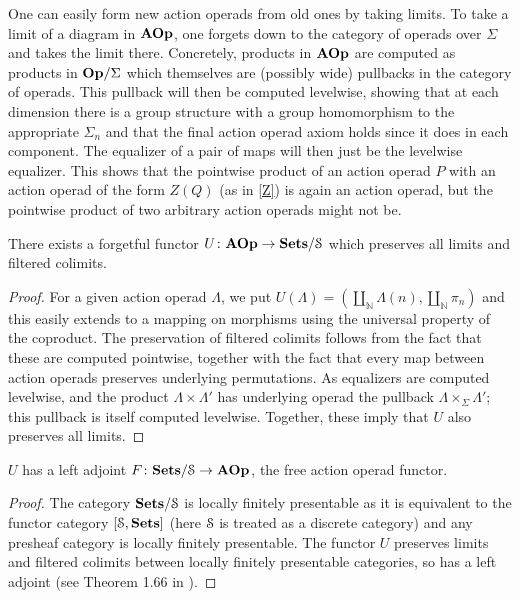 \begin{example}
One can easily form new action operads from old ones by taking limits. To take a limit of a diagram in $\mathbf{AOp}$, one forgets down to the category of operads over $\Sigma$ and takes the limit there. Concretely, products in $\mathbf{AOp}$ are computed as products in $\mathbf{Op}/\Sigma$ which themselves are (possibly wide) pullbacks in the category of operads. This pullback will then be computed levelwise, showing that at each dimension there is a group structure with a group homomorphism to the appropriate $\Sigma_{n}$ and that the final action operad axiom holds since it does in each component. The equalizer of a pair of maps will then just be the levelwise equalizer. This shows that the pointwise product of an action operad $P$ with an action operad of the form $Z(Q)$ (as in \cref{Z}) is again an action operad, but the pointwise product of two arbitrary action operads might not be.
\end{example}
\begin{thm}\label{underlyingSS}
There exists a forgetful functor $U \colon \mathbf{AOp} \rightarrow \mathbf{Sets}/\mathcal{S}$ which preserves all limits and filtered colimits.
\end{thm}

\begin{proof}
For a given action operad $\Lambda$, we put $U(\Lambda) = \left(\coprod_{\mathbb{N}} \Lambda(n), \coprod_{\mathbb{N}} \pi_n \right)$ and this easily extends to a mapping on morphisms using the universal property of the coproduct. The preservation of filtered colimits follows from the fact that these are computed pointwise, together with the fact that every map between action operads preserves underlying permutations.
As equalizers are computed levelwise, and the product $\Lambda \times \Lambda'$ has underlying operad the pullback $\Lambda \times_{\Sigma} \Lambda'$; this pullback is itself computed levelwise. Together, these imply that $U$ also preserves all limits.
\end{proof}

\begin{cor}
$U$ has a left adjoint $F \colon \mathbf{Sets}/\mathcal{S} \rightarrow \mathbf{AOp}$, the free action operad functor.
\end{cor}
\begin{proof}
The category $\mathbf{Sets}/\mathcal{S}$ is locally finitely presentable as it is equivalent to the functor category $[\mathcal{S}, \mathbf{Sets}]$ (here $\mathcal{S}$ is treated as a discrete category) and any presheaf category is locally finitely presentable. The functor $U$ preserves limits and filtered colimits between locally finitely presentable categories, so has a left adjoint (see Theorem 1.66 in \cite{ar}).
\end{proof}

